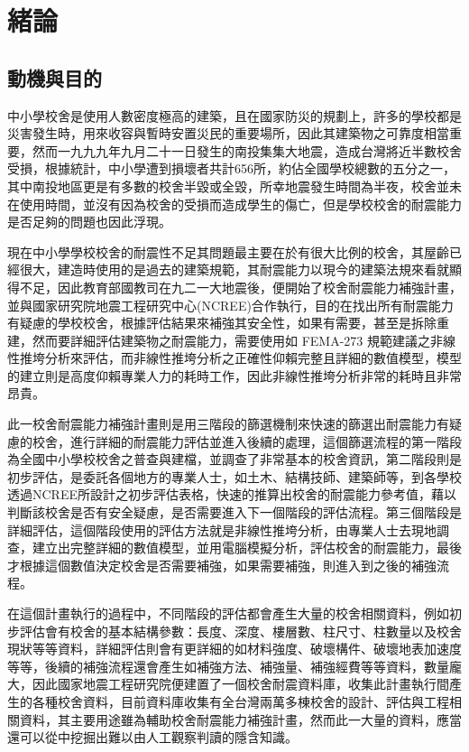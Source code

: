 % 
\chapter{緒論}
\label{cha:intro} 

\section{動機與目的}

中小學校舍是使用人數密度極高的建築，且在國家防災的規劃上，許多的學校都是災害發生時，用來收容與暫時安置災民的重要場所，因此其建築物之可靠度相當重要，然而一九九九年九月二十一日發生的南投集集大地震，造成台灣將近半數校舍受損，根據統計，中小學遭到損壞者共計656所，約佔全國學校總數的五分之一，其中南投地區更是有多數的校舍半毀或全毀，所幸地震發生時間為半夜，校舍並未在使用時間，並沒有因為校舍的受損而造成學生的傷亡，但是學校校舍的耐震能力是否足夠的問題也因此浮現。

現在中小學學校校舍的耐震性不足其問題最主要在於有很大比例的校舍，其屋齡已經很大，建造時使用的是過去的建築規範，其耐震能力以現今的建築法規來看就顯得不足，因此教育部國教司在九二一大地震後，便開始了校舍耐震能力補強計畫，並與國家研究院地震工程研究中心(NCREE)合作執行，目的在找出所有耐震能力有疑慮的學校校舍，根據評估結果來補強其安全性，如果有需要，甚至是拆除重建，然而要詳細評估建築物之耐震能力，需要使用如 FEMA-273\cite{building1997nehrp} 規範建議之非線性推垮分析來評估，而非線性推垮分析之正確性仰賴完整且詳細的數值模型，模型的建立則是高度仰賴專業人力的耗時工作，因此非線性推垮分析非常的耗時且非常昂貴。

此一校舍耐震能力補強計畫則是用三階段的篩選機制來快速的篩選出耐震能力有疑慮的校舍，進行詳細的耐震能力評估並進入後續的處理，這個篩選流程的第一階段為全國中小學校校舍之普查與建檔，並調查了非常基本的校舍資訊，第二階段則是初步評估，是委託各個地方的專業人士，如土木、結構技師、建築師等，到各學校透過NCREE所設計之初步評估表格，快速的推算出校舍的耐震能力參考值，藉以判斷該校舍是否有安全疑慮，是否需要進入下一個階段的評估流程。第三個階段是詳細評估，這個階段使用的評估方法就是非線性推垮分析，由專業人士去現地調查，建立出完整詳細的數值模型，並用電腦模擬分析，評估校舍的耐震能力，最後才根據這個數值決定校舍是否需要補強，如果需要補強，則進入到之後的補強流程。

在這個計畫執行的過程中，不同階段的評估都會產生大量的校舍相關資料，例如初步評估會有校舍的基本結構參數：長度、深度、樓層數、柱尺寸、柱數量以及校舍現狀等等資料，詳細評估則會有更詳細的如材料強度、破壞構件、破壞地表加速度等等，後續的補強流程還會產生如補強方法、補強量、補強經費等等資料，數量龐大，因此國家地震工程研究院便建置了一個校舍耐震資料庫，收集此計畫執行間產生的各種校舍資料，目前資料庫收集有全台灣兩萬多棟校舍的設計、評估與工程相關資料，其主要用途雖為輔助校舍耐震能力補強計畫，然而此一大量的資料，應當還可以從中挖掘出難以由人工觀察判讀的隱含知識。

